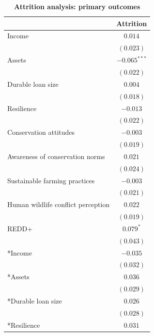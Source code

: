 \documentclass[
]{article}
\begin{document}
\begin{table}[h!]
\caption{\textbf{Attrition analysis: primary outcomes}}
\begin{center}
\begin{tabular}{l c}
\hline
 & Attrition \\
\hline
Income                             & $0.014$        \\
                                   & $(0.023)$      \\
Assets                             & $-0.065^{***}$ \\
                                   & $(0.022)$      \\
Durable loan size                  & $0.004$        \\
                                   & $(0.018)$      \\
Resilience                         & $-0.013$       \\
                                   & $(0.022)$      \\
Conservation attitudes             & $-0.003$       \\
                                   & $(0.019)$      \\
Awareness of conservation norms    & $0.021$        \\
                                   & $(0.024)$      \\
Sustainable farming practices      & $-0.003$       \\
                                   & $(0.021)$      \\
Human wildlife conflict perception & $0.022$        \\
                                   & $(0.019)$      \\
REDD+                              & $0.079^{*}$    \\
                                   & $(0.043)$      \\
*Income                            & $-0.035$       \\
                                   & $(0.032)$      \\
*Assets                            & $0.036$        \\
                                   & $(0.029)$      \\
*Durable loan size                 & $0.026$        \\
                                   & $(0.028)$      \\
*Resilience                        & $0.031$        \\

\end{tabular}
\end{center}
\end{table}
\end{document}
